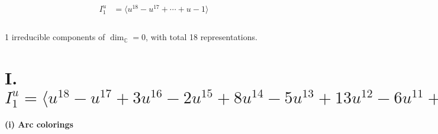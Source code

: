 \documentclass[1p]{elsarticle_modified}
\theoremstyle{definition}
\begin{document}
\begin{align*}
I^u_{1}&=\langle 
u^{18}- u^{17}+\cdots+u-1\rangle \\
\\
\end{align*}
\raggedright * 1 irreducible components of $\dim_{\mathbb{C}}=0$, with total 18 representations.\\
\newpage
\renewcommand{\arraystretch}{1}
\centering \section*{I. $I^u_{1}= \langle u^{18}- u^{17}+3 u^{16}-2 u^{15}+8 u^{14}-5 u^{13}+13 u^{12}-6 u^{11}+17 u^{10}-5 u^9+15 u^8-2 u^7+10 u^6+2 u^5+2 u^4+4 u^3- u^2+u-1 \rangle$}
\flushleft \textbf{(i) Arc colorings}\\
\end{document}
